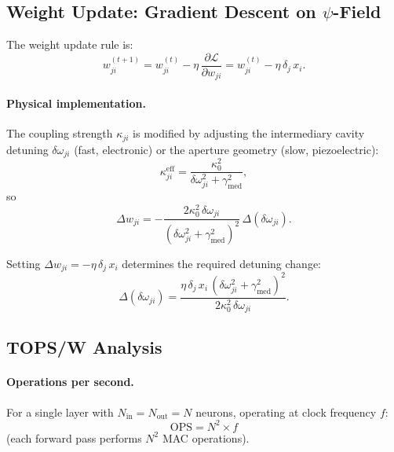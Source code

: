 \documentclass[11pt,twocolumn]{article}
\theoremstyle{definition}
\theoremstyle{remark}
\begin{document}
\subsection{Weight Update: Gradient Descent on $\psi$-Field}\label{sec:weight_update}

The weight update rule is:
\begin{equation}
w_{ji}^{(t+1)} = w_{ji}^{(t)} - \eta\,\frac{\partial\mathcal{L}}{\partial w_{ji}}
= w_{ji}^{(t)} - \eta\,\delta_j\,x_i.
\label{eq:sgd}
\end{equation}

\paragraph{Physical implementation.}
The coupling strength $\kappa_{ji}$ is modified by adjusting the
intermediary cavity detuning $\delta\omega_{ji}$ (fast, electronic) or
the aperture geometry (slow, piezoelectric):
\begin{equation}
\kappa_{ji}^{\mathrm{eff}} = \frac{\kappa_0^2}{\delta\omega_{ji}^2 + \gamma_{\mathrm{med}}^2},
\end{equation}
so
\begin{equation}
\Delta w_{ji} = -\frac{2\kappa_0^2\,\delta\omega_{ji}}{(\delta\omega_{ji}^2 + \gamma_{\mathrm{med}}^2)^2}\,\Delta(\delta\omega_{ji}).
\end{equation}

Setting $\Delta w_{ji} = -\eta\,\delta_j\,x_i$ determines the required
detuning change:
\begin{equation}
\Delta(\delta\omega_{ji}) = \frac{\eta\,\delta_j\,x_i\,(\delta\omega_{ji}^2 + \gamma_{\mathrm{med}}^2)^2}{2\kappa_0^2\,\delta\omega_{ji}}.
\end{equation}

\subsection{TOPS/W Analysis}\label{sec:topsw}

\paragraph{Operations per second.}
For a single layer with $N_{\mathrm{in}} = N_{\mathrm{out}} = N$
neurons, operating at clock frequency $f$:
\begin{equation}
\mathrm{OPS} = N^2 \times f
\end{equation}
(each forward pass performs $N^2$ MAC operations).
\end{document}
